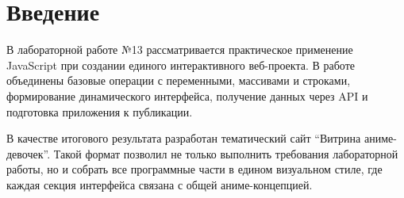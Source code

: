 \chapter*{Введение}

В лабораторной работе №13 рассматривается практическое применение JavaScript при создании единого интерактивного веб-проекта. В работе объединены базовые операции с переменными, массивами и строками, формирование динамического интерфейса, получение данных через API и подготовка приложения к публикации.

В качестве итогового результата разработан тематический сайт ``Витрина аниме-девочек''. Такой формат позволил не только выполнить требования лабораторной работы, но и собрать все программные части в едином визуальном стиле, где каждая секция интерфейса связана с общей аниме-концепцией.
